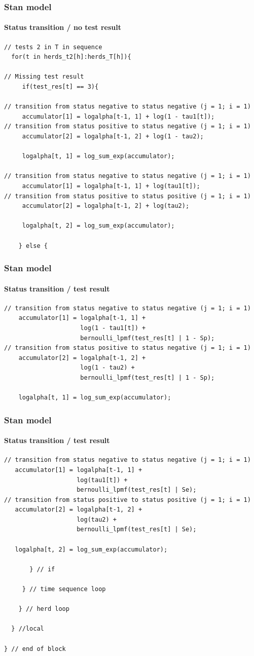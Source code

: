 \documentclass{beamer}
\begin{document}
\begin{frame}[fragile]
\frametitle{Stan model}
\framesubtitle{Status transition / no test result}
\scriptsize
\begin{verbatim}
// tests 2 in T in sequence
  for(t in herds_t2[h]:herds_T[h]){

// Missing test result     
     if(test_res[t] == 3){

// transition from status negative to status negative (j = 1; i = 1)
     accumulator[1] = logalpha[t-1, 1] + log(1 - tau1[t]);
// transition from status positive to status negative (j = 1; i = 1)
     accumulator[2] = logalpha[t-1, 2] + log(1 - tau2);

     logalpha[t, 1] = log_sum_exp(accumulator);

// transition from status negative to status negative (j = 1; i = 1)
     accumulator[1] = logalpha[t-1, 1] + log(tau1[t]);
// transition from status positive to status positive (j = 1; i = 1)
     accumulator[2] = logalpha[t-1, 2] + log(tau2);

     logalpha[t, 2] = log_sum_exp(accumulator);

    } else {
 \end{verbatim}
\end{frame}


\begin{frame}[fragile]
\frametitle{Stan model}
\framesubtitle{Status transition / test result}
\scriptsize
\begin{verbatim}
// transition from status negative to status negative (j = 1; i = 1)
    accumulator[1] = logalpha[t-1, 1] + 
                     log(1 - tau1[t]) + 
                     bernoulli_lpmf(test_res[t] | 1 - Sp);
// transition from status positive to status negative (j = 1; i = 1)
    accumulator[2] = logalpha[t-1, 2] + 
                     log(1 - tau2) + 
                     bernoulli_lpmf(test_res[t] | 1 - Sp);

    logalpha[t, 1] = log_sum_exp(accumulator);
\end{verbatim}
\end{frame}


\begin{frame}[fragile]
\frametitle{Stan model}
\framesubtitle{Status transition / test result}
\scriptsize
\begin{verbatim}
// transition from status negative to status negative (j = 1; i = 1)
   accumulator[1] = logalpha[t-1, 1] + 
                    log(tau1[t]) + 
                    bernoulli_lpmf(test_res[t] | Se);
// transition from status positive to status positive (j = 1; i = 1)
   accumulator[2] = logalpha[t-1, 2] + 
                    log(tau2) + 
                    bernoulli_lpmf(test_res[t] | Se);

   logalpha[t, 2] = log_sum_exp(accumulator);

       } // if

     } // time sequence loop

    } // herd loop

  } //local

} // end of block
\end{verbatim}
\end{frame}
\end{document}
